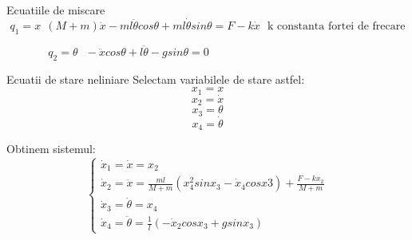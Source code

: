 \documentclass[12pt]{article}
\begin{document}
Ecuatiile de miscare
\begin{equation}
q_1 = x ~~ (M+m) \ddot  x - ml \ddot  \theta cos \theta + ml \dot \theta sin \theta = F - k \dot x ~~~\text{k constanta fortei de frecare} 
\end{equation}

\begin{equation}
q_2 = \theta~~~ -\ddot x cos \theta +l \ddot \theta - g sin \theta = 0 {~~~~~~~~~~~~~~~~~~~~~~~~~~~~~~~~~~~~~~~~~~~~~~~~~~~~~~~~~~~~~~~~}
\end{equation}

 Ecuatii de stare neliniare \newline\newline
Selectam variabilele de stare astfel: \begin{equation} x_1 = x \end{equation} \begin{equation} x_2 = \dot x \end{equation} \begin{equation} x_3 = \theta \end{equation} \begin{equation} x_4 = \dot \theta \end{equation}

Obtinem sistemul:
\[
\left\{ 
\begin{array}{c}
\dot x_1 =  \dot x = x_2 {~~~~~~~~~~~~~~~~~~~~~~~~~~~~~~~~~~~~~~~~~}\\ 
\dot x_2 = \ddot x  = \frac{ml}{M+m} (x_4^2 sin x_3 - \dot x_4 cos x3) + \frac{F-kx_2}{M+m}\\ 
\dot x_3 = \dot \theta = x_4{~~~~~~~~~~~~~~~~~~~~~~~~~~~~~~~~~~~~~~~~~}\\
\dot x_4 = \ddot \theta = \frac{1}{l}(- \dot x_2 cos x_3 + g sin x_3) {~~~~~~~~~~~~~~~}
\end{array}
\right. 
\]\newline
\end{document}
